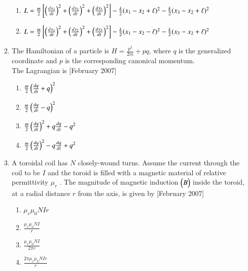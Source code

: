 \documentclass[journal]{IEEEtran}
\begin{document}
\begin{enumerate}
\begin{enumerate}
\item  $  L = \frac{m}{2} {}\left[ \left(\frac{dx_1}{dt}\right)^2 + \left( \frac{dx_2}{dt} \right)^2 + \left( \frac{dx_3}{dt} \right)^2\right] - \frac{k}{2} (x_1 - x_2 + \ell)^2 - \frac{k}{2} (x_3 - x_2 + \ell)^2$
\item $  L = \frac{m}{2} {}\left[ \left(\frac{dx_1}{dt}\right)^2 + \left( \frac{dx_2}{dt} \right)^2 + \left( \frac{dx_3}{dt} \right)^2\right]  - \frac{k}{2} (x_1 - x_2 - \ell)^2 - \frac{k}{2} (x_3 - x_2 + \ell)^2$
\end{enumerate}
\item The Hamiltonian of a particle is $ H = \frac{p^2}{2m} + pq $, where  $q$ is the generalized coordinate and  $p$  is the corresponding canonical momentum.\\ The Lagrangian is \hfill[February 2007]

\begin{enumerate}
\item $  \frac{m}{2} \left( \frac{dq}{dt} + q \right)^2 $ 
\item $  \frac{m}{2} \left( \frac{dq}{dt} - q \right)^2 $
\item $  \frac{m}{2} \left( \frac{dq}{dt} \right)^2 + q \frac{dq}{dt} - q^2 $
\item $  \frac{m}{2} \left( \frac{dq}{dt} \right)^2 - q \frac{dq}{dt} + q^2 $
\end{enumerate}
\item A toroidal coil has  $N$  closely-wound turns. Assume the current through the coil to be $I$ and the toroid is filled with a magnetic material of relative permittivity $ \mu_r$ . The magnitude of magnetic induction $\begin{pmatrix}B\end{pmatrix} $ inside the toroid, at a radial distance $r$  from the axis, is given by \hfill[February 2007]

\begin{enumerate}
\item $  \mu_r \mu_0 NIr $
\item $ \frac{\mu_r \mu_0 NI}{r} $
\item $  \frac{\mu_r \mu_0 NI}{2 \pi r} $
\item $ \frac{2 \pi \mu_r \mu_0 NIr}{r} $
\end{enumerate}
\end{enumerate}
\end{document}
